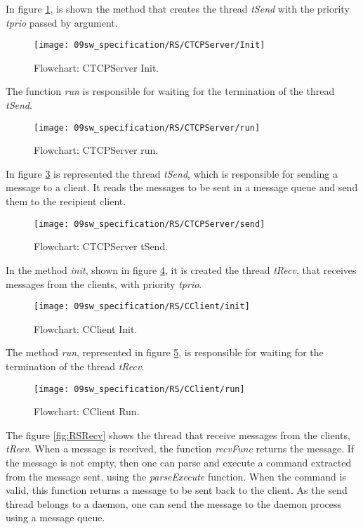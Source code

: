 In figure \ref{fig:RSInit}, is shown the method that creates the thread \textit{tSend} with the priority \textit{tprio} passed by argument.

\begin{figure}[H]
	\centering
	\texttt{[image: 09sw\_specification/RS/CTCPServer/Init]}
	\caption{Flowchart: CTCPServer Init.}
	\label{fig:RSInit}
\end{figure}

The function \textit{run} is responsible for waiting for the termination of the thread \textit{tSend}.

\begin{figure}[H]
	\centering
	\texttt{[image: 09sw\_specification/RS/CTCPServer/run]}
	\caption{Flowchart: CTCPServer run.}
	\label{fig:RSrun}
\end{figure}

In figure \ref{fig:RSsend} is represented the thread \textit{tSend}, which is responsible for sending a message to a client. It reads the messages to be sent in a message queue and send them to the recipient client.

\begin{figure}[H]
	\centering
	\texttt{[image: 09sw\_specification/RS/CTCPServer/send]}
	\caption{Flowchart: CTCPServer tSend.}
	\label{fig:RSsend}
\end{figure}


In the method \textit{init}, shown in figure \ref{fig:clientInit}, it is created the thread \textit{tRecv}, that receives messages from the clients, with priority \textit{tprio}.

\begin{figure}[H]
	\centering
	\texttt{[image: 09sw\_specification/RS/CClient/init]}
	\caption{Flowchart: CClient Init.}
	\label{fig:clientInit}
\end{figure}

The method \textit{run}, represented in figure \ref{fig:clientRun}, is responsible for waiting for the termination of the thread \textit{tRecv}.

\begin{figure}[H]
	\centering
	\texttt{[image: 09sw\_specification/RS/CClient/run]}
	\caption{Flowchart: CClient Run.}
	\label{fig:clientRun}
\end{figure}

The figure \ref{fig:RSRecv} shows the thread that receive messages from the clients, \textit{tRecv}. When a message is received, the function \textit{recvFunc} returns the message. If the message is not empty, then one can parse and execute a command extracted from the message sent, using the \textit{parseExecute} function. When the command is valid, this function returns a message to be sent back to the client. As the send thread belongs to a daemon, one can send the message to the daemon process using a message queue.

